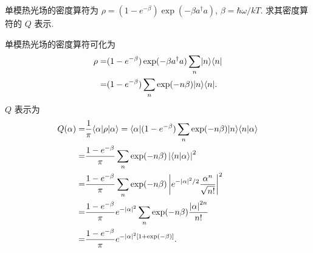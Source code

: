 \documentclass{assignment}
\begin{document}
\begin{prob}
    单模热光场的密度算符为 $\rho=(1-e^{-\beta})\exp(-\beta a^{\dagger}a)$, $\beta=\hbar\omega/kT$. 求其密度算符的 $Q$ 表示.
\end{prob}
\begin{sol}
    单模热光场的密度算符可化为
    \begin{align}
        \notag\rho=&(1-e^{-\beta})\exp(-\beta a^{\dagger}a)\sum_n\lvert n\rangle\langle n\rvert\\
        \notag=&(1-e^{-\beta})\sum_n\exp(-n\beta)\lvert n\rangle\langle n\rvert.
    \end{align}
    $Q$ 表示为
    \begin{align}
        \notag Q(\alpha)=&\frac{1}{\pi}\langle\alpha\rvert\rho\lvert\alpha\rangle=\langle\alpha\rvert(1-e^{-\beta})\sum_n\exp(-n\beta)\lvert n\rangle\langle n\vert\alpha\rangle\\
        \notag=&\frac{1-e^{-\beta}}{\pi}\sum_n\exp(-n\beta)\left\lvert\langle n\vert\alpha\rangle\right\rvert^2\\
        \notag=&\frac{1-e^{-\beta}}{\pi}\sum_n\exp(-n\beta)\left\lvert e^{-\left\lvert\alpha\right\rvert^2/2}\frac{\alpha^n}{\sqrt{n!}}\right\rvert^2\\
        \notag=&\frac{1-e^{-\beta}}{\pi}e^{-\left\lvert\alpha\right\rvert^2}\sum_n\exp(-n\beta)\frac{\left\lvert\alpha\right\rvert^{2n}}{n!}\\
        =&\frac{1-e^{-\beta}}{\pi}e^{-\left\lvert\alpha\right\rvert^2[1+\exp(-\beta)]}.
    \end{align}
\end{sol}
\end{document}
